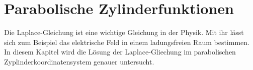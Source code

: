 %
%
%
\chapter{Parabolische Zylinderfunktionen\label{chapter:parzyl}}
\begin{refsection}

Die Laplace-Gleichung ist eine wichtige Gleichung in der Physik.
Mit ihr lässt sich zum Beispiel das elektrische Feld in einem ladungsfreien Raum bestimmen.
In diesem Kapitel wird die Lösung der Laplace-Gliechung im 
parabolischen Zyplinderkoordinatensystem genauer untersucht.





\printbibliography[heading=subbibliography]
\end{refsection}
